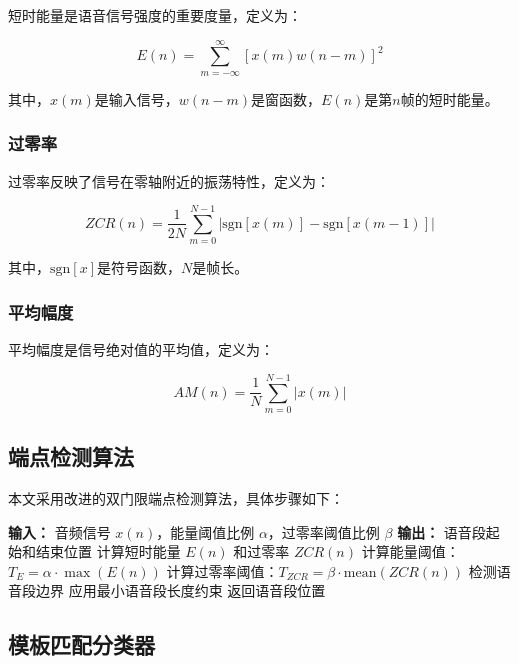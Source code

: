 \documentclass[sigconf,nonacm]{acmart}
\begin{document}
短时能量是语音信号强度的重要度量，定义为：

\begin{equation}
E(n) = \sum_{m=-\infty}^{\infty} [x(m)w(n-m)]^2
\end{equation}

其中，$x(m)$是输入信号，$w(n-m)$是窗函数，$E(n)$是第$n$帧的短时能量。

\subsubsection{过零率}

过零率反映了信号在零轴附近的振荡特性，定义为：

\begin{equation}
ZCR(n) = \frac{1}{2N} \sum_{m=0}^{N-1} |\text{sgn}[x(m)] - \text{sgn}[x(m-1)]|
\end{equation}

其中，$\text{sgn}[x]$是符号函数，$N$是帧长。

\subsubsection{平均幅度}

平均幅度是信号绝对值的平均值，定义为：

\begin{equation}
AM(n) = \frac{1}{N} \sum_{m=0}^{N-1} |x(m)|
\end{equation}

\subsection{端点检测算法}

本文采用改进的双门限端点检测算法，具体步骤如下：

\begin{algorithmic}
\STATE \textbf{输入：} 音频信号 $x(n)$，能量阈值比例 $\alpha$，过零率阈值比例 $\beta$
\STATE \textbf{输出：} 语音段起始和结束位置
\STATE 计算短时能量 $E(n)$ 和过零率 $ZCR(n)$
\STATE 计算能量阈值：$T_E = \alpha \cdot \max(E(n))$
\STATE 计算过零率阈值：$T_{ZCR} = \beta \cdot \text{mean}(ZCR(n))$
\STATE 检测语音段边界
\STATE 应用最小语音段长度约束
\STATE 返回语音段位置
\end{algorithmic}

\subsection{模板匹配分类器}
\end{document}
